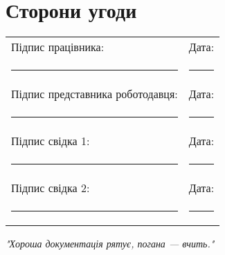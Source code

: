 \documentclass[a4paper,11pt]{article}
\begin{document}
\section*{Сторони угоди}

\vspace{2em}
\noindent\begin{tabular}{@{}p{8cm}p{8cm}@{}}
Підпис працівника: & Дата: \\
\rule{8cm}{0.4pt} & \rule{8cm}{0.4pt} \\
Підпис представника роботодавця: & Дата: \\
\rule{8cm}{0.4pt} & \rule{8cm}{0.4pt} \\
Підпис свідка 1: & Дата: \\
\rule{8cm}{0.4pt} & \rule{8cm}{0.4pt} \\
Підпис свідка 2: & Дата: \\
\rule{8cm}{0.4pt} & \rule{8cm}{0.4pt}
\end{tabular}

\vfill

\begin{center}
    \textit{"Хороша документація рятує, погана — вчить."}
\end{center}
\end{document}
